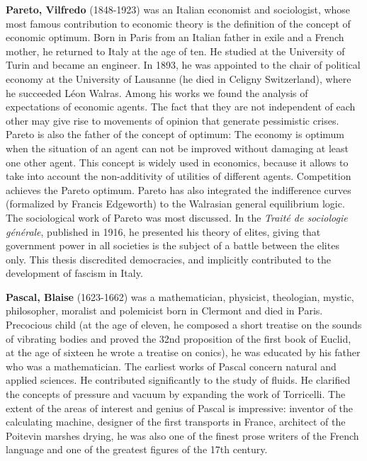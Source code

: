 {}

\textbf{Pareto, Vilfredo} (1848-1923) was an Italian economist and sociologist, whose most famous contribution to economic theory is the definition of the concept of economic optimum. Born in Paris from an Italian father in exile and a French mother, he returned to Italy at the age of ten. He studied at the University of Turin and became an engineer. In 1893, he was appointed to the chair of political economy at the University of Lausanne (he died in Celigny Switzerland), where he succeeded Léon Walras. Among his works we found the analysis of expectations of economic agents. The fact that they are not independent of each other may give rise to movements of opinion that generate pessimistic crises. Pareto is also the father of the concept of optimum: The economy is optimum when the situation of an agent can not be improved without damaging at least one other agent. This concept is widely used in economics, because it allows to take into account the non-additivity of utilities of different agents. Competition achieves the Pareto optimum. Pareto has also integrated the indifference curves (formalized by Francis Edgeworth) to the Walrasian general equilibrium logic. The sociological work of Pareto was most discussed. In the \textit{Traité de sociologie générale}, published in 1916, he presented his theory of elites, giving that government power in all societies is the subject of a battle between the elites only. This thesis discredited democracies, and implicitly contributed to the development of fascism in Italy.

\textbf{Pascal, Blaise} (1623-1662) was a mathematician, physicist, theologian, mystic, philosopher, moralist and polemicist born in Clermont and died in Paris. Precocious child (at the age of eleven, he composed a short treatise on the sounds of vibrating bodies and proved the 32nd proposition of the first book of Euclid, at the age of sixteen he wrote a treatise on conics), he was educated by his father who was a mathematician. The earliest works of Pascal concern natural and applied sciences. He contributed significantly to the study of fluids. He clarified the concepts of pressure and vacuum by expanding the work of Torricelli. The extent of the areas of interest and genius of Pascal is impressive: inventor of the calculating machine, designer of the first transports in France, architect of the Poitevin marshes drying, he was also one of the finest prose writers of the French language and one of the greatest figures of the 17th century.


